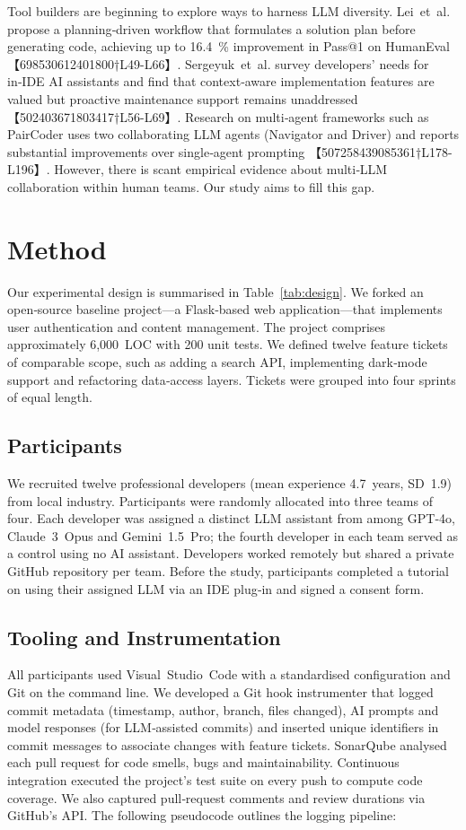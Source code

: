\documentclass[conference]{IEEEtran}
\begin{document}
Tool builders are beginning to explore ways to harness LLM diversity.  Lei et al. propose a planning‑driven workflow that formulates a solution plan before generating code, achieving up to 16.4 \% improvement in Pass@1 on HumanEval 【698530612401800†L49-L66】.  Sergeyuk et al. survey developers’ needs for in‑IDE AI assistants and find that context‑aware implementation features are valued but proactive maintenance support remains unaddressed 【502403671803417†L56-L69】.  Research on multi‑agent frameworks such as PairCoder uses two collaborating LLM agents (Navigator and Driver) and reports substantial improvements over single‑agent prompting 【507258439085361†L178-L196】.  However, there is scant empirical evidence about multi‑LLM collaboration within human teams.  Our study aims to fill this gap.

\section{Method}
Our experimental design is summarised in Table \ref{tab:design}.  We forked an open‑source baseline project—a Flask‑based web application—that implements user authentication and content management.  The project comprises approximately 6,000 LOC with 200 unit tests.  We defined twelve feature tickets of comparable scope, such as adding a search API, implementing dark‑mode support and refactoring data‑access layers.  Tickets were grouped into four sprints of equal length.

\subsection{Participants}
We recruited twelve professional developers (mean experience 4.7 years, SD 1.9) from local industry.  Participants were randomly allocated into three teams of four.  Each developer was assigned a distinct LLM assistant from among GPT‑4o, Claude 3 Opus and Gemini 1.5 Pro; the fourth developer in each team served as a control using no AI assistant.  Developers worked remotely but shared a private GitHub repository per team.  Before the study, participants completed a tutorial on using their assigned LLM via an IDE plug‑in and signed a consent form.

\subsection{Tooling and Instrumentation}
All participants used Visual Studio Code with a standardised configuration and Git on the command line.  We developed a Git hook instrumenter that logged commit metadata (timestamp, author, branch, files changed), AI prompts and model responses (for LLM‑assisted commits) and inserted unique identifiers in commit messages to associate changes with feature tickets.  SonarQube analysed each pull request for code smells, bugs and maintainability.  Continuous integration executed the project’s test suite on every push to compute code coverage.  We also captured pull‑request comments and review durations via GitHub’s API.  The following pseudocode outlines the logging pipeline:
\end{document}
